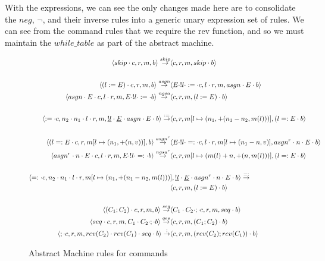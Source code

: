 With the expressions, we can see the only changes made here are to consolidate the $neg$, $\neg$, and their inverse rules into a generic unary expression set of rules. 
\newpage
We can see from the command rules that we require the rev function, and so we must maintain the $while\_table$ as part of the abstract machine.
\begin{figure}[ht]
    \centering
    \footnotesize
    \begin{align*}
    \astate{skip}{}{}{} \arule{skip}& \astate{}{}{}{skip} \\
    \\
    \astate{(l := E)}{}{}{} \arule{asgn}& \astate{E \cdot !l \cdot :=}{l}{}{asgn \cdot E} \\
    \bstate{asgn \cdot E}{l}{}{E \cdot !l \cdot :=} \arule{ngsa}& \bstate{}{}{}{(l := E)} \\
    \\
    \astate{:=}{n_2 \cdot n_1 \cdot l}{}{\underline{!l} \cdot \underline{E} \cdot asgn \cdot E}
    \arule{:=}& \astate{}{}{l \mapsto (n_1, +(n_1 - n_2, m(l)))}{(l =: E} \\
    \\
    \astate{(l =: E}{}{l \mapsto (n_1, +(n, v))}{} \arule{asgn^r}&
    \astate{E \cdot !l \cdot =:}{l}{l \mapsto (n_1 - n, v)}{asgn^r \cdot n \cdot E} \\
    \bstate{asgn^r \cdot n \cdot E}{l}{}{E \cdot !l \cdot =:} \arule{ngsa^r}&
    \bstate{}{}{l \mapsto (m(l) + n, +(n, m(l)))}{(l =: E} \\
    \\
    \astate{=:}{n_2 \cdot n_1 \cdot l}{l \mapsto (n_1, +(n_1 - n_2, m(l)))&}{\underline{!l} \cdot \underline{E} \cdot asgn^r \cdot n \cdot E}
    \arule{=:}& \\ &\astate{}{}{}{(l := E)} \\
    \\
    \astate{(C_1;C_2)}{}{}{} \arule{seq}& \astate{C_1 \cdot C_2 \cdot ;}{}{}{seq} \\
    \bstate{seq}{}{}{C_1 \cdot C_2 \cdot ;} \arule{qes}& \astate{}{}{}{(C_1;C_2)} \\
    \astate{;}{}{}{rev(C_2) \cdot rev(C_1) \cdot seq} \arule{;}& \astate{}{}{}{(rev(C_2);rev(C_1))}
    \end{align*}
    \caption{Abstract Machine rules for commands}
    \label{fig:abstract_machine_commands}
\end{figure}


